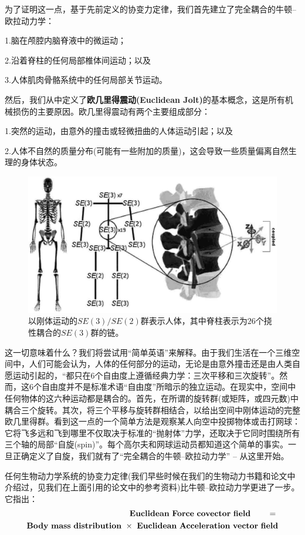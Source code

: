 \documentclass[11pt,fontset=founder]{ctexart}
\begin{document}
为了证明这一点，基于先前定义的协变力定律，我们首先建立了完全耦合的牛顿–欧拉动力学：

1.\quad 脑在颅腔内脑脊液中的微运动；

2.\quad 沿着脊柱的任何局部椎体间运动；以及

3.\quad 人体肌肉骨骼系统中的任何局部关节运动。\newline

然后，我们从中定义了\textbf{欧几里得震动(Euclidean Jolt)}的基本概念，这是所有机械损伤的主要原因。欧几里得震动有两个主要组成部分：

1.\quad 突然的运动，由意外的撞击或轻微扭曲的人体运动引起；以及

2.\quad 人体不自然的质量分布(可能有一些附加的质量)，这会导致一些质量偏离自然生理的身体状态。
\begin{figure}[h]
\centerline{\includegraphics[width=13cm]{SpineSE3}}
\caption{以刚体运动的$SE(3)/SE(2)$群表示人体，其中脊柱表示为$26$个挠性耦合的$SE(3)$群的链。}
\label{SpineSE3}
\end{figure}

这一切意味着什么？我们将尝试用“简单英语”来解释。由于我们生活在一个三维空间中，人们可能会认为，人体的任何部分的运动，无论是由意外撞击还是由人类自愿运动引起的，“都只在6个自由度上遵循经典力学：三次平移和三次旋转”。然而，这6个自由度并不是标准术语“自由度”所暗示的独立运动。在现实中，空间中任何物体的这六种运动都是耦合的。首先，在所谓的旋转群(或矩阵，或四元数)中耦合三个旋转。其次，将三个平移与旋转群相结合，以给出空间中刚体运动的完整欧几里得群。看到这一点的一个简单方法是观察某人向空中投掷物体或击打网球：它将飞多远和飞到哪里不仅取决于标准的“抛射体”力学，还取决于它同时围绕所有三个轴的局部“自旋(spin)”。每个高尔夫和网球运动员都知道这个简单的事实。一旦正确定义了自旋，我们就有了“完全耦合的牛顿–欧拉动力学” -- 从这里开始。\newline

任何生物动力学系统的协变力定律(我们早些时候在我们的生物动力书籍和论文中介绍过，见我们在上面引用的论文中的参考资料)比牛顿–欧拉动力学更进了一步。它指出：
\begin{eqnarray*}
\mathbf{Euclidean\ Force\ covector\ field\ } \qquad\mathbf{=\newline
} \\
\mathbf{Body\ mass\ distribution\ \times \ Euclidean\ Acceleration\
vector\ field}
\end{eqnarray*}
\end{document}
